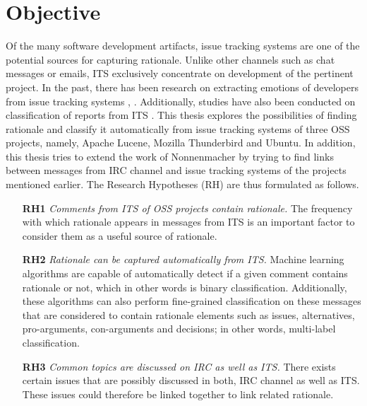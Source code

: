 \documentclass[a4paper,12pt,twoside]{report}
\begin{document}
\section{Objective}
Of the many software development artifacts, issue tracking systems are one of the potential sources for capturing rationale. Unlike other channels such as chat messages or emails, ITS exclusively concentrate on development of the pertinent project. In the past, there has been research on extracting emotions of developers from issue tracking systems \cite{Marshall2016}, \cite{Robillard2017}. Additionally, studies have also been conducted on classification of reports from ITS \cite{Fan2017}. This thesis explores the possibilities of finding rationale and classify it automatically from issue tracking systems of three OSS projects, namely, Apache Lucene, Mozilla Thunderbird and Ubuntu. In addition, this thesis tries to extend the work of Nonnenmacher \cite{Nonnenmacher2017} by trying to find links between messages from IRC channel and issue tracking systems of the projects mentioned earlier. The Research Hypotheses (RH) are thus formulated as follows.

\begin{itemize}
\item[\textbf{RH1}] \textit{Comments from ITS of OSS projects contain rationale.} The frequency with which rationale appears in messages from ITS is an important factor to consider them as a useful source of rationale.   
\item[\textbf{RH2}] \textit{Rationale can be captured automatically from ITS.} Machine learning algorithms are capable of automatically detect if a given comment contains rationale or not, which in other words is binary classification. Additionally, these algorithms can also perform fine-grained classification on these messages that are considered to contain rationale elements such as issues, alternatives, pro-arguments, con-arguments and decisions; in other words, multi-label classification. 
\item[\textbf{RH3}] \textit{Common topics are discussed on IRC as well as ITS.} There exists certain issues that are possibly discussed in both, IRC channel as well as ITS. These issues could therefore be linked together to link related rationale.    
\end{itemize}
\end{document}
